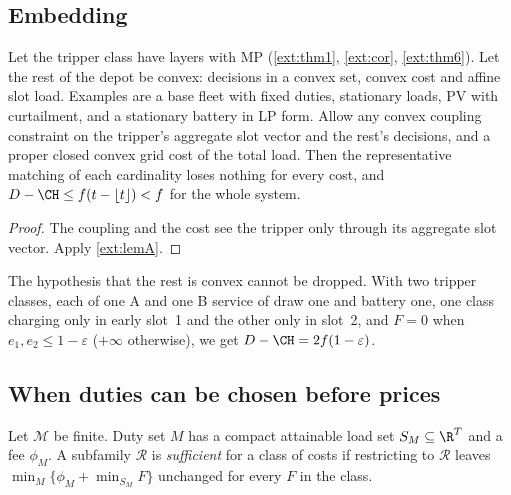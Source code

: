 \subsection*{Embedding}

\begin{theorem}[Embedding]\label{ext:thm4}
Let the tripper class have layers with MP
(\cref{ext:thm1}, \cref{ext:cor}, \cref{ext:thm6}). Let the rest of the depot
be convex: decisions in a convex set, convex cost and affine slot load.
Examples are a base fleet with fixed duties, stationary loads, PV with
curtailment, and a stationary battery in LP form. Allow any convex coupling
constraint on the tripper's aggregate slot vector and the rest's decisions,
and a proper closed convex grid cost of the total load. Then the
representative matching of each cardinality loses nothing for every cost, and
$D-\CH\le f(t-\lfloor t\rfloor)<f$ for the whole system.
\end{theorem}
\begin{proof}
The coupling and the cost see the tripper only through its aggregate slot
vector. Apply \cref{ext:lemA}.
\end{proof}

The hypothesis that the rest is convex cannot be dropped. With two tripper
classes, each of one A and one B service of draw one and battery one, one
class charging only in early slot~1 and the other only in slot~2, and $F=0$
when $e_1,e_2\le1-\varepsilon$ ($+\infty$ otherwise), we get
$D-\CH=2f(1-\varepsilon)$.

\subsection*{When duties can be chosen before prices}

Let $\mathcal M$ be finite. Duty set $M$ has a compact attainable load set
$S_M\subseteq\R^T$ and a fee $\phi_M$. A subfamily $\mathcal R$ is
\emph{sufficient} for a class of costs if restricting to $\mathcal R$ leaves
$\min_M\{\phi_M+\min_{S_M}F\}$ unchanged for every $F$ in the class.

